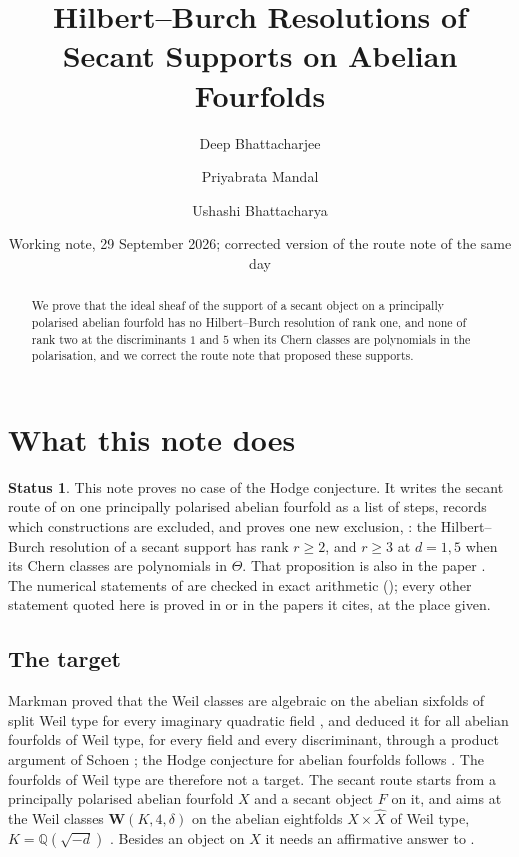 \documentclass[11pt]{amsart}
\title{Hilbert--Burch Resolutions of Secant Supports on Abelian Fourfolds}
\author{Deep Bhattacharjee}
\author{Priyabrata Mandal}
\author{Ushashi Bhattacharya}
\date{Working note, 29 September 2026; corrected version of the route note of
the same day}
\theoremstyle{definition}
\newtheorem{status}[theorem]{Status}
\theoremstyle{remark}
\newcommand{\QQ}{\mathbb{Q}}
\begin{document}
\begin{abstract}
We prove that the ideal sheaf of the support of a secant object on a
principally polarised abelian fourfold has no Hilbert--Burch resolution of
rank one, and none of rank two at the discriminants $1$ and $5$ when its
Chern classes are polynomials in the polarisation, and we correct the route
note that proposed these supports.
\end{abstract}

\maketitle

\section{What this note does}\label{sec:status}

\begin{status}\label{st:proves}
This note proves no case of the Hodge conjecture. It writes the secant route
of \cite[Section~18]{BMB} on one principally polarised abelian fourfold as a
list of steps, records which constructions are excluded, and proves one new
exclusion, : the Hilbert--Burch resolution of a secant
support has rank $r\ge2$, and $r\ge3$ at $d=1,5$ when its Chern classes are
polynomials in $\Theta$. That proposition is also in the paper
\cite[Proposition~18.60]{BMB}. The numerical statements of
 are checked in exact arithmetic
(); every other statement quoted here is proved in
\cite{BMB} or in the papers it cites, at the place given.
\end{status}

\subsection*{The target}
Markman proved that the Weil classes are algebraic on the abelian sixfolds of
split Weil type for every imaginary quadratic field \cite{Mar25a,Mar25b}, and
deduced it for all abelian fourfolds of Weil type, for every field and every
discriminant, through a product argument of Schoen
\cite[Proposition~10]{Sch98}; the Hodge conjecture for abelian fourfolds
follows \cite[Section~1]{BMB}. The fourfolds of Weil type are therefore not a
target. The secant route starts from a principally polarised abelian fourfold
$X$ and a secant object $F$ on it, and aims at the Weil classes
$\mathbf{W}(K,4,\delta)$ on the abelian eightfolds $X\times\widehat X$ of
Weil type, $K=\QQ(\sqrt{-d})$ \cite[Theorem~18.29(iv),
Remark~18.69]{BMB}. Besides an object on $X$ it needs an affirmative answer
to \cite[Question~11.4]{Mar25b}.
\end{document}
